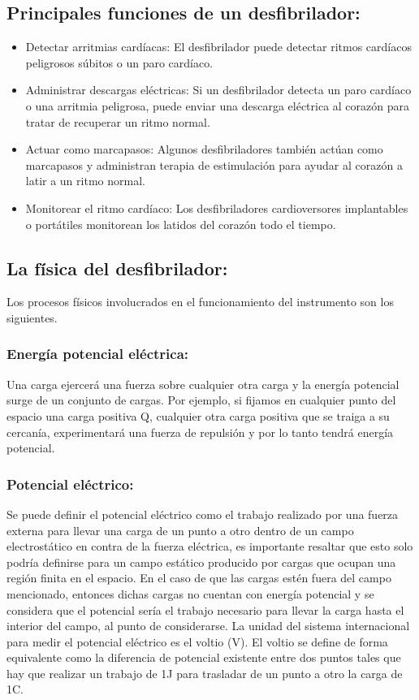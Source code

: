 \subsection{Principales funciones de un desfibrilador:}
\begin{itemize}
    \item Detectar arritmias cardíacas: El desfibrilador puede detectar ritmos cardíacos peligrosos súbitos o un paro cardíaco.
    \item Administrar descargas eléctricas: Si un desfibrilador detecta un paro cardíaco o una arritmia peligrosa, puede enviar una descarga eléctrica al corazón para tratar de recuperar un ritmo normal.
    \item Actuar como marcapasos: Algunos desfibriladores también actúan como marcapasos y administran terapia de estimulación para ayudar al corazón a latir a un ritmo normal.
    \item Monitorear el ritmo cardíaco: Los desfibriladores cardioversores implantables o portátiles monitorean los latidos del corazón todo el tiempo.
\end{itemize}

\subsection{La física del desfibrilador:}

Los procesos físicos involucrados en el funcionamiento del instrumento son los siguientes.

\subsubsection{Energía potencial eléctrica:}
Una carga ejercerá una fuerza sobre cualquier otra carga y la energía potencial surge de un conjunto de cargas. Por ejemplo, si fijamos en cualquier punto del espacio una carga positiva Q, cualquier otra carga positiva que se traiga a su cercanía, experimentará una fuerza de repulsión y por lo tanto tendrá energía potencial.

\subsubsection{Potencial eléctrico:}

Se puede definir el potencial eléctrico como el trabajo realizado por una fuerza externa para llevar una carga de un punto a otro dentro de un campo electrostático en contra de la fuerza eléctrica, es importante resaltar que esto solo podría definirse para un campo estático producido por cargas que ocupan una región finita en el espacio. En el caso de que las cargas estén fuera del campo mencionado, entonces dichas cargas no cuentan con energía potencial y se considera que el potencial sería el trabajo necesario para llevar la carga hasta el interior del campo, al punto de considerarse. La unidad del sistema internacional para medir el potencial eléctrico es el voltio (V). \newline \hfill \break
El voltio se define de forma equivalente como la diferencia de potencial existente entre dos puntos tales que hay que realizar un trabajo de 1J para trasladar de un punto a otro la carga de 1C.

